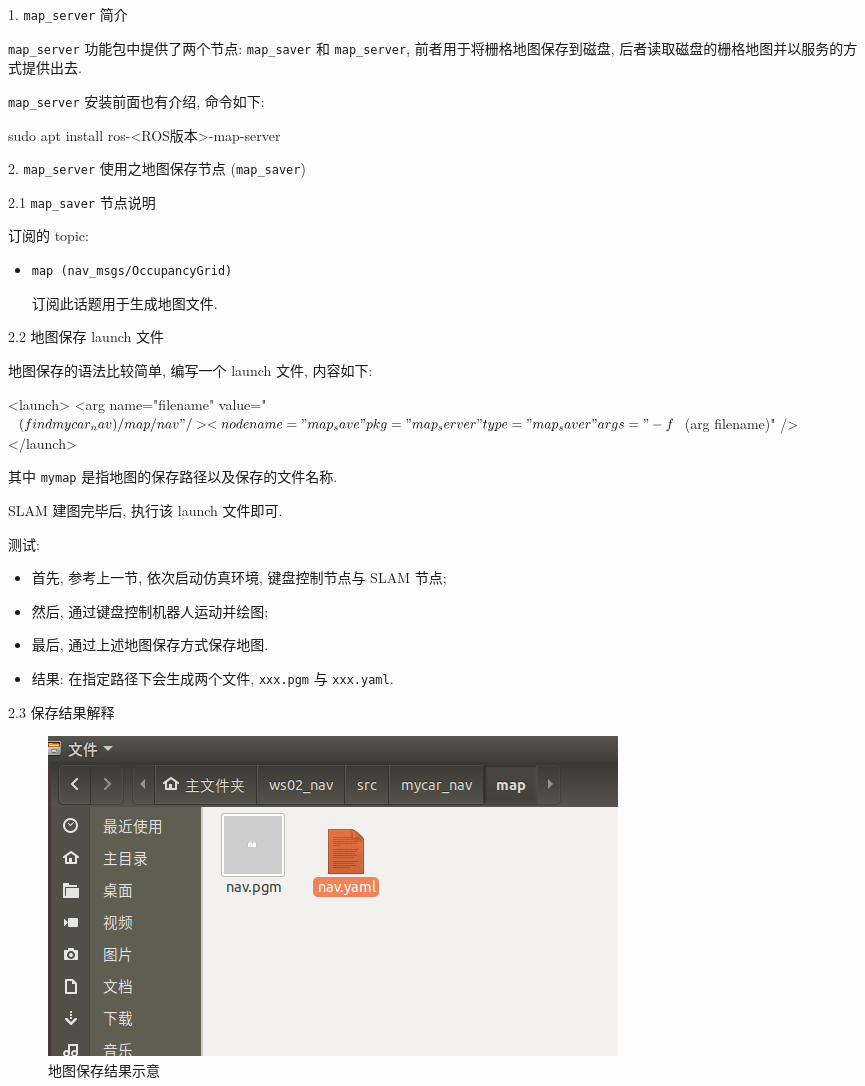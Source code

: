 \documentclass[openany, fontset=windowsold]{ctexbook}
\theoremstyle{kaiti}
\theoremstyle{normal}
\begin{document}
1. \verb|map_server| 简介

\verb|map_server| 功能包中提供了两个节点: \verb|map_saver| 和 \verb|map_server|, 前者用于将栅格地图保存到磁盘, 后者读取磁盘的栅格地图并以服务的方式提供出去.

\verb|map_server| 安装前面也有介绍, 命令如下:

\begin{bash}
  sudo apt install ros-<ROS版本>-map-server
\end{bash}

2. \verb|map_server| 使用之地图保存节点 (\verb|map_saver|)

2.1 \verb|map_saver| 节点说明

订阅的 topic:

\begin{itemize}
  \item \verb|map (nav_msgs/OccupancyGrid)|

  订阅此话题用于生成地图文件.
\end{itemize}

2.2 地图保存 launch 文件

地图保存的语法比较简单, 编写一个 launch 文件, 内容如下:

\begin{xml}
  <launch>
      <arg name="filename" value="$(find mycar_nav)/map/nav" />
      <node name="map_save" pkg="map_server" type="map_saver" args="-f $(arg filename)" />
  </launch>
\end{xml}

其中 \verb|mymap| 是指地图的保存路径以及保存的文件名称.

SLAM 建图完毕后, 执行该 launch 文件即可.

测试:

\begin{itemize}
  \item 首先, 参考上一节, 依次启动仿真环境, 键盘控制节点与 SLAM 节点; 
  \item 然后, 通过键盘控制机器人运动并绘图; 
  \item 最后, 通过上述地图保存方式保存地图.
  \item 结果: 在指定路径下会生成两个文件, \verb|xxx.pgm| 与 \verb|xxx.yaml|.
\end{itemize}

2.3 保存结果解释

\begin{figure}[!ht]
  \centering
  \includegraphics[width=.6\textwidth]{ros_demo_nav_save_map.png}
  \caption{地图保存结果示意}
  \label{fig:ros_demo_nav_save_map}
\end{figure}
\end{document}
